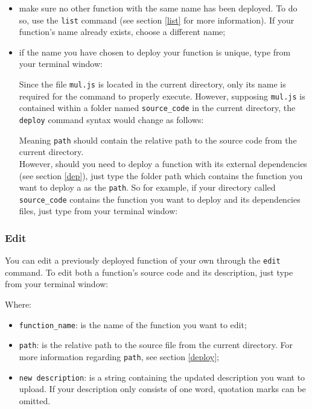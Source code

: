 \begin{itemize}
\item make sure no other function with the same name has been deployed. To do so, use the \texttt{list} command (see section \ref{list} for more information). If your function's name already exists, choose a different name;
\item if the name you have chosen to deploy your function is unique, type from your terminal window:
\begin{center}
\end{center}
Since the file \texttt{mul.js} is located in the current directory, only its name is required for the command to properly execute. However, supposing \texttt{mul.js} is contained within a folder named \texttt{source\_code} in the current directory, the \texttt{deploy} command syntax would change as follows:
\begin{center}
\end{center}
Meaning \texttt{path} should contain the relative path to the source code from the current directory. \\
However, should you need to deploy a function with its external dependencies (see section \ref{dep}), just type the folder path which contains the function you want to deploy a as the \texttt{path}. So for example, if your directory called \texttt{source\_code} contains the function you want to deploy and its dependencies files, just type from your terminal window:
\begin{center}
\end{center}
\end{itemize}

\subsubsection{Edit}
You can edit a previously deployed function of your own through the \texttt{edit} command. To edit both a function's source code and its description, just type from your terminal window:
\begin{center}
\end{center}
Where:
\begin{itemize}
\item \texttt{function\_name}: is the name of the function you want to edit;
\item \texttt{path}: is the relative path to the source file from the current directory. For more information regarding \texttt{path}, see section \ref{deploy};
\item \texttt{new description}: is a string containing the updated description you want to upload. If your description only consists of one word, quotation marks can be omitted.
 \end{itemize}

